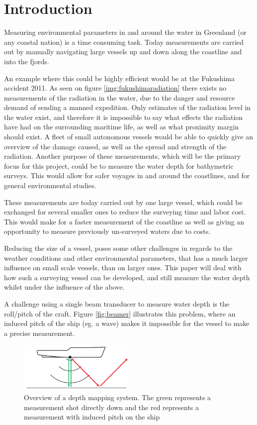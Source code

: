 \chapter{Introduction}
Measuring environmental parameters in and around the water in Greenland (or any coastal nation) is a time consuming task. Today measurements are carried out by manually navigating large vessels up and down along the coastline and into the fjords. 

An example where this could be highly efficient would be at the Fukushima accident 2011. As seen on figure \ref{img:fukushimaradiation} there exists no measurements of the radiation in the water, due to the danger and resource demand of sending a manned expedition. Only estimates of the radiation level in the water exist, and therefore it is impossible to say what effects the radiation have had on the surrounding maritime life, as well as what proximity margin should exist. A fleet of small autonomous vessels would be able to quickly give an overview of the damage caused, as well as the spread and strength of the radiation.
Another purpose of these measurements, which will be the primary focus for this project, could be to measure the water depth for bathymetric surveys. This would allow for safer voyages in and around the coastlines, and for general environmental studies. 

These measurements are today carried out by one large vessel, which could be exchanged for several smaller ones to reduce the surveying time and labor cost. This would make for a faster measurement of the coastline as well as giving an opportunity to measure previously un-surveyed waters due to costs. 

Reducing the size of a vessel, poses some other challenges in regards to the weather conditions and other environmental parameters, that has a much larger influence on small scale vessels, than on larger ones. This paper will deal with how such a surveying vessel can be developed, and still measure the water depth whilst under the influence of the above.

A challenge using a single beam transducer to measure water depth is the roll/pitch of the craft. Figure \vref{fig:beamer} illustrates this problem, where an induced pitch of the ship (eg. a wave) makes it impossible for the vessel to make a precise measurement.

\begin{figure}[h]
\centering
\includegraphics[width=0.5\textwidth]{img/beamer}
\caption{Overview of a depth mapping system. The green represents a measurement shot directly down and the red represents a measurement with induced pitch on the ship}
\label{fig:beamer}
\end{figure}

